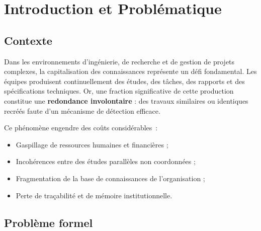 \documentclass[12pt, a4paper]{article}
\begin{document}
\begin{titlepage}
\begin{center}
    \vfill



  \end{center}
\end{titlepage}

\newpage
\thispagestyle{plain}
{
  \hypersetup{linkcolor=AIMSblue}
  \tableofcontents
}
\newpage

\section{Introduction et Problématique}

\subsection{Contexte}

Dans les environnements d'ingénierie, de recherche et de gestion de projets complexes, la capitalisation des connaissances représente un défi fondamental. Les équipes produisent continuellement des études, des tâches, des rapports et des spécifications techniques. Or, une fraction significative de cette production constitue une \textbf{redondance involontaire} : des travaux similaires ou identiques recréés faute d'un mécanisme de détection efficace.

Ce phénomène engendre des coûts considérables~:

\begin{itemize}
  \item Gaspillage de ressources humaines et financières ;
  \item Incohérences entre des études parallèles non coordonnées ;
  \item Fragmentation de la base de connaissances de l'organisation ;
  \item Perte de traçabilité et de mémoire institutionnelle.
\end{itemize}

\subsection{Problème formel}
\end{document}
